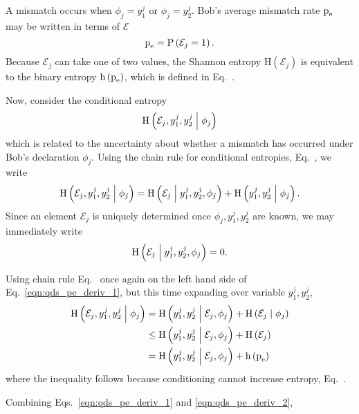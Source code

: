 A mismatch occurs when $\phi_j = y_1^j$ or $\phi_j = y_2^j$. Bob's average mismatch rate $\text{p}_{\text{e}}$ may be written in terms of $\mathcal{E}$
\begin{equation}
\text{p}_{\text{e}} = \text{P}\left(\mathcal{E}_j = 1\right).
\end{equation}
Because $\mathcal{E}_j$ can take one of two values, the Shannon entropy $\text{H}\left(\mathcal{E}_j\right)$ is equivalent to the binary entropy $\text{h}\left(\text{p}_{\text{e}}\right)$, which is defined in Eq.~. %

Now, consider the conditional entropy
\begin{equation}
\text{H}\left(\mathcal{E}_j, y_1^j, y_2^j \; \middle| \; \phi_j\right)
\end{equation}
which is related to the uncertainty about whether a mismatch has occurred under Bob's declaration $\phi_j$. Using the chain rule for conditional entropies, Eq.~, we write
\begin{equation}\label{eqn:qds_pe_deriv_1}
\text{H}\left( \mathcal{E}_j, y_1^j, y_2^j \; \middle| \; \phi_j \right) = 
\text{H}\left( \mathcal{E}_j \; \middle| \; y_1^j, y_2^j, \phi_j\right) + 
\text{H}\left( y_1^j, y_2^j \; \middle| \; \phi_j\right).
\end{equation}
Since an element $\mathcal{E}_j$ is uniquely determined once $\phi_j, y_1^j, y_2^j$ are known, we may immediately write
\begin{equation}
\text{H}\left( \mathcal{E}_j \; \middle| \; y_1^j, y_2^j, \phi_j\right) = 0.
\end{equation}

\noindent Using chain rule Eq.~ once again on the left hand side of Eq.~\ref{eqn:qds_pe_deriv_1}, but this time expanding over variable $y_1^j, y_2^j$,
\begin{align}\label{eqn:qds_pe_deriv_2}
\text{H}\left( \mathcal{E}_j, y_1^j, y_2^j \; \middle| \; \phi_j \right) &=
\text{H}\left(y_1^j, y_2^j \; \middle| \; \mathcal{E}_j, \phi_j\right) + \text{H}\left(\mathcal{E}_j \; \middle| \; \phi_j\right) \notag \\
&\le \text{H}\left(y_1^j, y_2^j \; \middle| \; \mathcal{E}_j, \phi_j\right) + \text{H}\left(\mathcal{E}_j\right) \notag \\
&= \text{H}\left(y_1^j, y_2^j \; \middle| \; \mathcal{E}_j, \phi_j\right) + \text{h}\left(\text{p}_{\text{e}}\right)
\end{align}
where the inequality follows because conditioning cannot increase entropy, Eq.~.

Combining Eqs.~\ref{eqn:qds_pe_deriv_1} and \ref{eqn:qds_pe_deriv_2},

